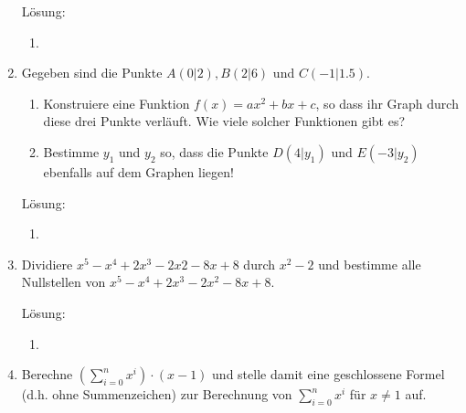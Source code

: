 \documentclass[../main.tex]{subfiles}
\begin{document}
\begin{enumerate}
	      Lösung:
	      \begin{enumerate}
		      \item
	      \end{enumerate}
	\item Gegeben sind die Punkte \begin{math}
		      A(0|2), B(2|6)
	      \end{math} und \begin{math}
		      C(-1|1.5)
	      \end{math}.
	      \begin{enumerate}
		      \item Konstruiere eine Funktion \begin{math}
			            f(x) = ax^2 + bx + c
		            \end{math}, so dass ihr Graph durch
		            diese drei Punkte verläuft.
		            Wie viele solcher Funktionen gibt es?
		      \item Bestimme \begin{math}
			            y_1
		            \end{math} und \begin{math}
			            y_2
		            \end{math} so, dass die Punkte
		            \begin{math}
			            D(4|y_1)
		            \end{math} und \begin{math}
			            E(-3|y_2)
		            \end{math} ebenfalls auf dem Graphen liegen!
	      \end{enumerate}

	      Lösung:
	      \begin{enumerate}
		      \item
	      \end{enumerate}
	\item Dividiere \begin{math}
		      x^5 - x^4 + 2x^3 -2x2 -8x +8
	      \end{math} durch \begin{math}
		      x^2 - 2
	      \end{math} und bestimme alle Nullstellen von \begin{math}
		      x^5 - x^4 + 2x^3 - 2x^2 - 8x +8
	      \end{math}.

	      Lösung:
	      \begin{enumerate}
		      \item
	      \end{enumerate}
	\item Berechne \begin{math}
		      (\sum_{i = 0}^{n} x^i) \cdot ( x -1)
	      \end{math} und stelle damit eine geschlossene Formel (d.h. ohne Summenzeichen) zur Berechnung von \begin{math}
		      \sum_{ i = 0}^{n} x^i
	      \end{math} für \begin{math}
		      x \neq 1
		\end{math} auf.


\end{enumerate}
\end{document}
